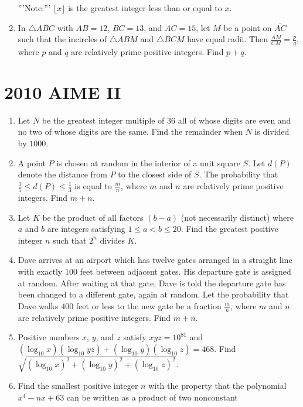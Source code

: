\documentclass{article}
\begin{document}
\begin{enumerate}[label=\arabic*., itemsep=0.5em]
'''Note:''' $\lfloor x \rfloor$ is the greatest integer less than or equal to $x$.\par \vspace{0.5em}\item In $\triangle{ABC}$ with $AB = 12$, $BC = 13$, and $AC = 15$, let $M$ be a point on $\overline{AC}$ such that the incircles of $\triangle{ABM}$ and $\triangle{BCM}$ have equal radii. Then $\frac{AM}{CM} = \frac{p}{q}$, where $p$ and $q$ are relatively prime positive integers. Find $p + q$.\par \vspace{0.5em}\end{enumerate}\newpage\section*{2010 AIME II}\begin{enumerate}[label=\arabic*., itemsep=0.5em]\item Let $N$ be the greatest integer multiple of $36$ all of whose digits are even and no two of whose digits are the same. Find the remainder when $N$ is divided by $1000$.\par \vspace{0.5em}\item A point $P$ is chosen at random in the interior of a unit square $S$. Let $d(P)$ denote the distance from $P$ to the closest side of $S$. The probability that $\frac{1}{5}\le d(P)\le\frac{1}{3}$ is equal to $\frac{m}{n}$, where $m$ and $n$ are relatively prime positive integers. Find $m+n$.\par \vspace{0.5em}\item Let $K$ be the product of all factors $(b-a)$ (not necessarily distinct) where $a$ and $b$ are integers satisfying $1\le a < b \le 20$. Find the greatest positive integer $n$ such that $2^n$ divides $K$.\par \vspace{0.5em}\item Dave arrives at an airport which has twelve gates arranged in a straight line with exactly $100$ feet between adjacent gates. His departure gate is assigned at random. After waiting at that gate, Dave is told the departure gate has been changed to a different gate, again at random. Let the probability that Dave walks $400$ feet or less to the new gate be a fraction $\frac{m}{n}$, where $m$ and $n$ are relatively prime positive integers. Find $m+n$.\par \vspace{0.5em}\item Positive numbers $x$, $y$, and $z$ satisfy $xyz = 10^{81}$ and $(\log_{10}x)(\log_{10} yz) + (\log_{10}y) (\log_{10}z) = 468$. Find $\sqrt {(\log_{10}x)^2 + (\log_{10}y)^2 + (\log_{10}z)^2}$.\par \vspace{0.5em}\item Find the smallest positive integer $n$ with the property that the polynomial $x^4 - nx + 63$ can be written as a product of two nonconstant 
\end{enumerate}
\end{document}
